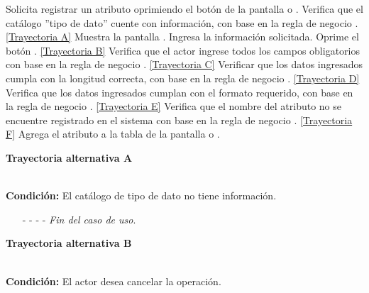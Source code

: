 	\begin{UCtrayectoria}
		\UCpaso[\UCactor] Solicita registrar un atributo oprimiendo el botón  de la pantalla  o .
		\UCpaso[\UCsist] Verifica que el catálogo ''tipo de dato'' cuente con información, con base en la regla de negocio . \hyperlink{CU7-1-1:TAA}{[Trayectoria A]}
		\UCpaso[\UCsist] Muestra la pantalla .
		\UCpaso[\UCactor] Ingresa la información solicitada. \label{CU7.1.1-P3}
		\UCpaso[\UCactor] Oprime el botón . \hyperlink{CU7-1-1:TAB}{[Trayectoria B]}
		\UCpaso[\UCsist] Verifica que el actor ingrese todos los campos obligatorios con base en la regla de negocio . \hyperlink{CU7-1-1:TAC}{[Trayectoria C]}
		\UCpaso[\UCsist] Verificar que los datos ingresados cumpla con la longitud correcta, con base en la regla de negocio . \hyperlink{CU7-1-1:TAD}{[Trayectoria D]}
		\UCpaso[\UCsist] Verifica que los datos ingresados cumplan con el formato requerido, con base en la regla de negocio . \hyperlink{CU7-1-1:TAE}{[Trayectoria E]}
		\UCpaso[\UCsist] Verifica que el nombre del atributo no se encuentre registrado en el sistema con base en la regla de negocio . \hyperlink{CU7-1-1:TAF}{[Trayectoria F]}
		\UCpaso[\UCsist] Agrega el atributo a la tabla  de la pantalla  o .
	\end{UCtrayectoria}		
\hypertarget{CU7-1-1:TAA}{\textbf{Trayectoria alternativa A}}\\
\noindent \textbf{Condición:} El catálogo de tipo de dato no tiene información.
\begin{enumerate}
	\UCpaso[\UCsist] Muestra el mensaje  en la pantalla  o  para indicar que no es posible realizar la operación debido a la falta de información necesaria para el sistema.
	\item[- -] - - {\em {Fin del caso de uso}}.%
\end{enumerate}
\hypertarget{CU7-1-1:TAB}{\textbf{Trayectoria alternativa B}}\\
\noindent \textbf{Condición:} El actor desea cancelar la operación.
